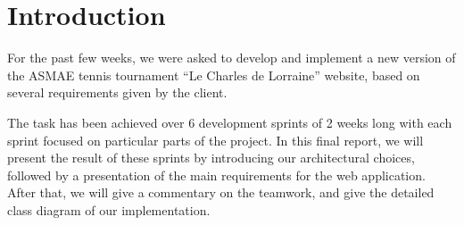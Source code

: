 \section{Introduction}
\label{sec:Introduction}

For the past few weeks, we were asked to develop and implement a new version of
the ASMAE tennis tournament \enquote{Le Charles de Lorraine} website, based on
several requirements given by the client.\newline

The task has been achieved over 6
development sprints of 2 weeks long with each sprint focused on particular
parts of the project. In this final report, we will present the result of these
sprints by introducing our architectural choices, followed by a presentation of
the main requirements for the web application. After that, we will give a
commentary on the teamwork, and give the detailed class diagram of our
implementation.
